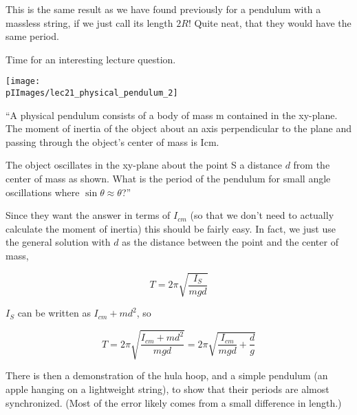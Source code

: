 This is the same result as we have found previously for a pendulum with a massless string, if we just call its length $2 R$! Quite neat, that they would have the same period.	

Time for an interesting lecture question.

\begin{center}
\texttt{[image: \\pIImages/lec21\_physical\_pendulum\_2]}
\end{center}

``A physical pendulum consists of a body of mass m contained in the xy-plane. The moment of inertia of the object about an axis perpendicular to the plane and passing through the object's center of mass is Icm.

The object oscillates in the xy-plane about the point S a distance $d$ from the center of mass as shown. What is the period of the pendulum for small angle oscillations where $\sin\theta \approx \theta$?''

Since they want the answer in terms of $I_{cm}$ (so that we don't need to actually calculate the moment of inertia) this should be fairly easy. In fact, we just use the general solution with $d$ as the distance between the point and the center of mass,

\begin{equation}
T = 2 \pi \sqrt{\frac{I_{S}}{m g d}}
\end{equation}

$I_S$ can be written as $I_{cm} + m d^2$, so

\begin{equation}
T = 2 \pi \sqrt{\frac{I_{cm} + m d^2}{m g d}} = 2 \pi \sqrt{\frac{I_{cm}}{m g d} + \frac{d}{g}}
\end{equation}

There is then a demonstration of the hula hoop, and a simple pendulum (an apple hanging on a lightweight string), to show that their periods are almost synchronized. (Most of the error likely comes from a small difference in length.)

